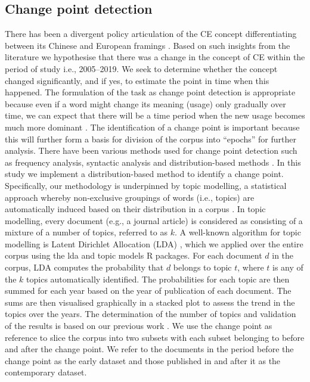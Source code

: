 \documentclass[output=paper]{langsci/langscibook}
\begin{document}
\subsection{Change point detection}
\label{ch03:changepointdetection}
There has been a divergent policy articulation of the CE concept differentiating between its Chinese and European framings \citep{mcdowall2017circular}. Based on such insights from the literature we  hypothesise that there was a change in the concept of CE within the period of study i.e., 2005--2019. We seek to determine whether the concept changed significantly, and if yes, to estimate the point in time when this happened. The formulation of the task as change point detection is appropriate because even if a word might change its meaning (usage) only gradually over time, we can expect that there will be  a time period when the new usage becomes much more dominant \citep{aminikhanghahi2017survey}. The identification of a change point is important because this will further form a basis for division of the corpus into ``epochs'' for further analysis. There have been various methods used for change point detection such as frequency analysis, syntactic analysis and distribution-based methods \citep{kulkarni2015statistically}. In this study we implement a distribution-based method to identify a change point. 
Specifically, our methodology is underpinned by topic modelling, a statistical approach whereby non-exclusive groupings of words (i.e., topics) are automatically induced based on their distribution in a corpus \citep{nikolenko2017topic}. In topic modelling, every document (e.g., a journal article) is considered as consisting of a mixture of a number of topics, referred to as $k$. A well-known algorithm for topic modelling is Latent Dirichlet Allocation (LDA) \citep{blei2003latent}, which we applied over the entire corpus using the lda \citep{chang2011lda} and topic models \citep{hornik2011topicmodels} R packages. For each document $d$ in the corpus, LDA computes the probability that $d$ belongs to topic $t$, where $t$ is any of the $k$ topics automatically identified. The probabilities for each topic are then summed for each year based on the year of publication of each document. The sums are then visualised graphically in a stacked plot to assess the trend in the topics over the years. The determination of the number of topics and validation of the results is based on our previous work \citep{mahanty2019studying}. We use the change point as reference to slice the corpus into two subsets with each subset belonging to before and after the change point. We refer to the documents in the period before the change point as the early dataset and those published in and after it as the contemporary dataset.
\end{document}
